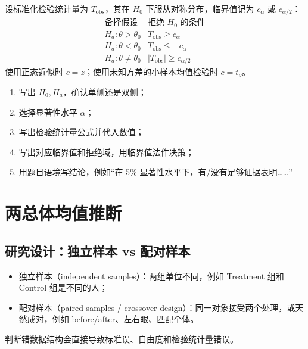\documentclass[11pt,a4paper]{article}
\theoremstyle{definition}
\theoremstyle{plain}
\theoremstyle{remark}
\begin{document}
\begin{memorybox}
设标准化检验统计量为 $T_{\mathrm{obs}}$，其在 $H_0$ 下服从对称分布，临界值记为 $c_\alpha$ 或 $c_{\alpha/2}$：
\[
\boxed{
\begin{array}{c|c}
\text{备择假设} & \text{拒绝 }H_0\text{ 的条件}\\
\hline
H_a:\theta>\theta_0 & T_{\mathrm{obs}}\ge c_\alpha\\
H_a:\theta<\theta_0 & T_{\mathrm{obs}}\le -c_\alpha\\
H_a:\theta\ne\theta_0 & |T_{\mathrm{obs}}|\ge c_{\alpha/2}
\end{array}
}
\]
使用正态近似时 $c=z$；使用未知方差的小样本均值检验时 $c=t_\nu$。
\end{memorybox}

\begin{methodbox}[假设检验书写模板]
\begin{enumerate}
    \item 写出 $H_0,H_a$，确认单侧还是双侧；
    \item 选择显著性水平 $\alpha$；
    \item 写出检验统计量公式并代入数值；
    \item 写出对应临界值和拒绝域，用临界值法作决策；
    \item 用题目语境写结论，例如“在 5\% 显著性水平下，有/没有足够证据表明……”
\end{enumerate}
\end{methodbox}

\section{两总体均值推断}
\label{sec:two-means}

\subsection{研究设计：独立样本 vs 配对样本}

\begin{keybox}[先判断数据结构]
\begin{itemize}
    \item 独立样本（independent samples）：两组单位不同，例如 Treatment 组和 Control 组是不同的人；
    \item 配对样本（paired samples / crossover design）：同一对象接受两个处理，或天然成对，例如 before/after、左右眼、匹配个体。
\end{itemize}
判断错数据结构会直接导致标准误、自由度和检验统计量错误。
\end{keybox}
\end{document}
